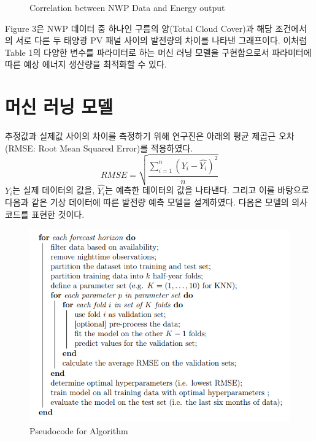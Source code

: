 \documentclass{article}
\begin{document}
\begin{figure}[!h]
\centering
{}
\caption{Correlation between NWP Data and Energy output}
\label{fig_3}
\end{figure}

Figure 3은 NWP 데이터 중 하나인 구름의 양(Total Cloud Cover)과 해당 조건에서의 서로 다른 두 태양광 PV 패널 사이의 발전량의 차이를 나타낸 그래프이다. 이처럼 Table 1의 다양한 변수를 파라미터로 하는 머신 러닝 모델을 구현함으로서 파라미터에 따른 예상 에너지 생산량을 최적화할 수 있다.

\section{머신 러닝 모델}
추정값과 실제값 사이의 차이를 측정하기 위해 연구진은 아래의 평균 제곱근 오차(RMSE: Root Mean Squared Error)를 적용하였다.
\begin{equation}
RMSE=\sqrt{\frac{\sum_{i=1}^{n}(Y_i-\hat{Y_i})^2}{n}}
\end{equation}
$Y_i$는 실제 데이터의 값을, $\hat{Y_i}$는 예측한 데이터의 값을 나타낸다.
그리고 이를 바탕으로 다음과 같은 기상 데이터에 따른 발전량 예측 모델을 설계하였다. 다음은 모델의 의사코드를 표현한 것이다.

\begin{figure}[h]
\centering
\includegraphics[scale=0.70]{./fig/Figure_5.png}
\caption{Pseudocode for Algorithm}
\label{fig_4}
\end{figure}
\end{document}
